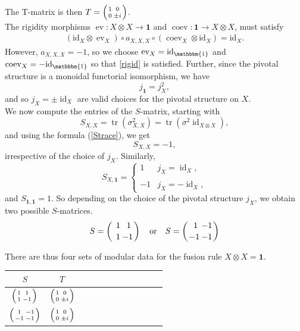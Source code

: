 \documentclass[11pt]{book}
\theoremstyle{Rem}
\theoremstyle{definition}
\numberwithin{equation}{section}
\newcommand{\tmt}[4]{\left({#1\atop #3}{#2\atop #4}\right)}
\newcommand\tr{\operatorname{tr}}
\newcommand\id{\operatorname{id}}
\newcommand\one{\mathbf{1}}
\newcommand\ev{\operatorname{ev}}
\newcommand\coev{\operatorname{coev}}
\begin{document}
 The T-matrix is then $T= \tmt{1}{0}{0}{\pm i}$.
\\
The rigidity morphisms $\ev: X\otimes X \rightarrow \one$ and $\coev:\one\rightarrow X\otimes X$, must satisfy
\begin{align}
(\text{id}_X\otimes \ev_X) \circ a_{X,X,X}\circ(\coev_X\otimes \text{id}_X) = \text{id}_X. \label{rigid}
\end{align}
However, $a_{X,X,X}=-1$, so we choose $\ev_X = \text{id}_{\mathbbm{1}}$ and $\coev_X=  -\text{id}_{\mathbbm{1}}$ so that \ref {rigid} is satisfied.
Further, since the pivotal structure is a monoidal functorial isomorphism, we have \begin{equation}
	j_\one = j_X^2,\nonumber
\end{equation}and so $j_X=\pm \id_X$ are valid choices for the pivotal structure on $X$.\\ 
We now compute the entries of the $S$-matrix, starting with \begin{equation}
	S_{X, X} = \tr(\sigma_{X, X}^2) =  \tr(\sigma^2 \id_{X\otimes X}),
\end{equation} and using the formula (\ref{Strace}), we get \begin{equation}
	S_{X,X} = -1,
\end{equation} irrespective of the choice of $j_X$.
Similarly, 
\begin{equation}
 	S_{X, \one} = \begin{cases} 1 &  j_X = \id_X, \\ \\-1 & j_X = -\id_X, \end{cases} 
 \end{equation} and $S_{\one, \one} = 1$.
 So depending on the choice of  the pivotal structure $j_X$, we obtain two possible $S$-matrices.
\begin{equation}
	S= \tmt{\ 1}{\ 1 }{\ 1}{-1} \quad \text{or} \quad S=\tmt{\ 1}{-1}{-1}{-1}
\end{equation}

There are thus four sets of modular data for the fusion rule $X\otimes X = \one$.
\begin{center}
\begin{tabular}{ | c  |c | c | c | c  | c | c | c | c | c |c | c |}
\hline
$S$ & $T$ \\ 
\hline
  $\tmt{1}{1}{1}{-1}$ & $\tmt{1}{0}{0}{\pm i}$  \\
 \hline
 $\tmt{1}{-1}{-1}{-1}$ & $\tmt{1}{0}{0}{\pm i}$  \\ 
 \hline
\end{tabular}
\end{center}
\end{document}
